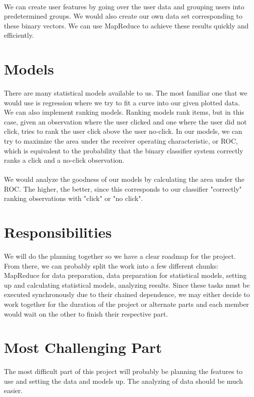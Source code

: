 \documentclass[11pt]{article}
\begin{document}
\paragraph{}
We can create user features by going over the user data and grouping users into predetermined groups. We would also create our own data set corresponding to these binary vectors. We can use MapReduce to achieve these results quickly and efficiently.

\section*{Models}
\paragraph{}
There are many statistical models available to us. The most familiar one that we would use is regression where we try to fit a curve into our given plotted data. We can also implement ranking models. Ranking models rank items, but in this case, given an observation where the user clicked and one where the user did not click, tries to rank the user click above the user no-click. In our models, we can try to maximize the area under the receiver operating characteristic, or ROC, which is equivalent to the probability that the binary classifier system correctly ranks a click and a no-click observation.

\paragraph{}
We would analyze the goodness of our models by calculating the area under the ROC. The higher, the better, since this corresponds to our classifier "correctly" ranking observations with "click" or "no click".

\section*{Responsibilities}
\paragraph{}
We will do the planning together so we have a clear roadmap for the project. From there, we can probably split the work into a few different chunks: MapReduce for data preparation, data preparation for statistical models, setting up and calculating statistical models, analyzing results. Since these tasks must be executed synchronously due to their chained dependence, we may either decide to work together for the duration of the project or alternate parts and each member would wait on the other to finish their respective part.

\section*{Most Challenging Part}
\paragraph{}
The most difficult part of this project will probably be planning the features to use and setting the data and models up. The analyzing of data should be much easier.
\end{document}

